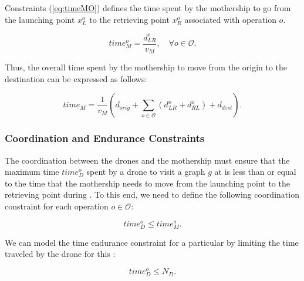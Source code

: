 {\noindent
Constraints (\ref{eq:timeMO}) defines the time spent by the mothership to go from the launching point $x_L^o$ to the retrieving point $x_R^o$ associated with operation $o$.

\begin{equation}\tag{Time$_M^o$}
time_M^o = \frac{d_{LR}^o}{v_M}, \quad \forall o \in \mathcal O.
\label{eq:timeMO}
\end{equation}

\noindent
Thus, the overall time spent by the mothership to move from the origin to the destination can be expressed as follows:

\begin{equation}\tag{Time$_M$}
time_M = \frac{1}{v_M} (d_{orig} + \sum_{o \in \mathcal O} (d_{LR}^o + d_{RL}^o) + d_{dest}).
\label{eq:timeM}
\end{equation}



\subsubsection*{Coordination and Endurance Constraints}
\noindent
The coordination between the drones and the mothership must ensure that the maximum time $time_D^o$ spent by a drone to visit a graph $g$ at  is less than or equal to the time that the mothership needs to move from the launching point to the retrieving point during . To this end, we need to define the following coordination constraint for each operation $o\in \mathcal O$:

\begin{equation}\tag{DCW-CO}\label{DCW}
time_D^o \leq time_M^o.
\end{equation}



\noindent
We can model the time endurance constraint for a particular  by limiting the time traveled by the drone for this :

\begin{equation}\tag{Endurance-CO}\label{CAP}
    time_D^o \leq N_D.
\end{equation}


}
